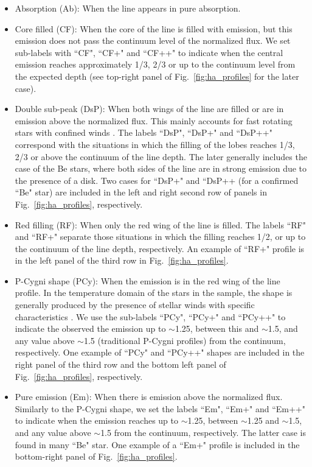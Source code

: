 \documentclass{aa}
\begin{document}
\begin{itemize}
    \item Absorption (Ab): When the line appears in pure absorption. \smallskip
    
    \item Core filled (CF): When the core of the line is filled with emission, but this emission does not pass the continuum level of the normalized flux. We set sub-labels with ``CF", ``CF+" and ``CF++" to indicate when the central emission reaches approximately 1/3, 2/3 or up to the continuum level from the expected depth (see top-right panel of Fig.~\ref{fig:ha_profiles} for the later case). \smallskip
    
    \item Double sub-peak (DsP): When both wings of the line are filled or are in emission above the normalized flux. This mainly accounts for fast rotating stars with confined winds \citep[see][Fig 8 for more information]{1996A&A...312..195P}. The labels ``DsP", ``DsP+" and ``DsP++" correspond with the situations in which the filling of the lobes reaches 1/3, 2/3 or above the continuum of the line depth. The later generally includes the case of the Be stars, where both sides of the line are in strong emission due to the presence of a disk. Two cases for ``DsP+" and ``DsP++ (for a confirmed ``Be" star) are included in the left and right second row of panels in Fig.~\ref{fig:ha_profiles}, respectively. \smallskip

    \item Red filling (RF): When only the red wing of the line is filled. The labels ``RF" and ``RF+" separate those situations in which the filling reaches 1/2, or up to the continuum of the line depth, respectively. An example of ``RF+" profile is in the left panel of the third row in Fig.~\ref{fig:ha_profiles}. \smallskip
    
    \item P-Cygni shape (PCy): When the emission is in the red wing of the line profile. In the temperature domain of the stars in the sample, the shape is generally produced by the presence of stellar winds with specific characteristics \citep[see, e.g.,][]{1979ApJS...39..481C}. We use the sub-labels ``PCy", ``PCy+" and ``PCy++" to indicate the observed the emission up to $\sim$1.25, between this and $\sim$1.5, and any value above $\sim$1.5 (traditional P-Cygni profiles) from the continuum, respectively. One example of ``PCy" and ``PCy++" shapes are included in the right panel of the third row and the bottom left panel of Fig.~\ref{fig:ha_profiles}, respectively. \smallskip
    
    \item Pure emission (Em): When there is emission above the normalized flux. Similarly to the P-Cygni shape, we set the labels ``Em", ``Em+" and ``Em++" to indicate when the emission reaches up to $\sim$1.25, between $\sim$1.25 and $\sim$1.5, and any value above $\sim$1.5 from the continuum, respectively. The latter case is found in many ``Be" star. One example of a ``Em+" profile is included in the bottom-right panel of Fig.~\ref{fig:ha_profiles}. \smallskip     
    
\end{itemize}
\end{document}
